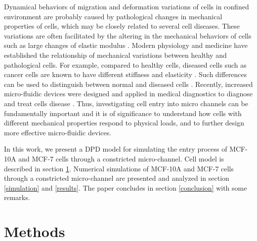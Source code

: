 \documentclass[%
 reprint,
 amsmath,amssymb,
 aps,
]{revtex4-1}
\begin{document}
Dynamical behaviors of migration and deformation variations of cells in confined environment are probably caused by pathological changes in mechanical properties of cells, which may be closely related to several cell diseases. These variations are often facilitated by the altering in the mechanical behaviors of cells such as large changes of elastic modulus \cite{hosseini_particle-based_2009}. Modern physiology and medicine have established the relationship of mechanical variations between healthy and pathological cells. For example, compared to healthy cells, diseased cells such as cancer cells are known to have different stiffness and elasticity \cite{lee_biomechanics_2007}. Such differences can be used to distinguish between normal and diseased cells \cite{bathe_neutrophil_2002,hou_deformability_2009}. Recently, increased micro-fluidic devices were designed and applied in medical diagnostics to diagnose and treat cells disease \cite{suresh_biomechanics_2007,liu_microfluidic_2010}. 
Thus, investigating cell entry into micro channels can be fundamentally important and it is of significance to understand how cells with different mechanical properties respond to physical loads, and to further design more effective micro-fluidic devices. 

In this work, we present a DPD model for simulating the entry process of  MCF-10A and MCF-7 cells through a constricted micro-channel. Cell model is described in section \ref{cell}.  Numerical simulations of MCF-10A and MCF-7 cells through a constricted micro-channel are presented and analyzed in section \ref{simulation} and \ref{results}. The paper concludes in section \ref{conclusion} with some remarks. 


\section{Methods}\label{cell}
\end{document}

